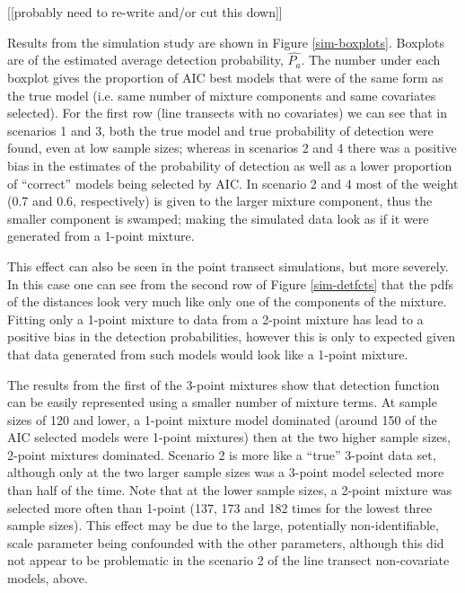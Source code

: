 \documentclass[useAMS,referee]{biom}
\begin{document}
[[probably need to re-write and/or cut this down]]

Results from the simulation study are shown in Figure \ref{sim-boxplots}. Boxplots are of the estimated average detection probability, $\hat{P_a}$. The number under each boxplot gives the proportion of AIC best models that were of the same form as the true model (i.e. same number of mixture components and same covariates selected). For the first row (line transects with no covariates) we can see that in scenarios 1 and 3, both the true model and true probability of detection were found, even at low sample sizes; whereas in scenarios 2 and 4 there was a positive bias in the estimates of the probability of detection as well as a lower proportion of ``correct'' models being selected by AIC. In scenario 2 and 4 most of the weight (0.7 and 0.6, respectively) is given to the larger mixture component, thus the smaller component is swamped; making the simulated data look as if it were generated from a 1-point mixture.

This effect can also be seen in the point transect simulations, but more severely. In this case one can see from the second row of Figure \ref{sim-detfcts} that the pdfs of the distances look very much like only one of the components of the mixture. Fitting only a 1-point mixture to data from a 2-point mixture has lead to a positive bias in the detection probabilities, however this is only to expected given that data generated from such models would look like a 1-point mixture.

The results from the first of the 3-point mixtures show that detection function can be easily represented using a smaller number of mixture terms. At sample sizes of 120 and lower, a 1-point mixture model dominated (around 150 of the AIC selected models were 1-point mixtures) then at the two higher sample sizes, 2-point mixtures dominated. Scenario 2 is more like a ``true'' 3-point data set, although only at the two larger sample sizes was a 3-point model selected more than half of the time. Note that at the lower sample sizes, a 2-point mixture was selected more often than 1-point (137, 173 and 182 times for the lowest three sample sizes). This effect may be due to the large, potentially non-identifiable, scale parameter being confounded with the other parameters, although this did not appear to be problematic in the scenario 2 of the line transect non-covariate models, above.
\end{document}
